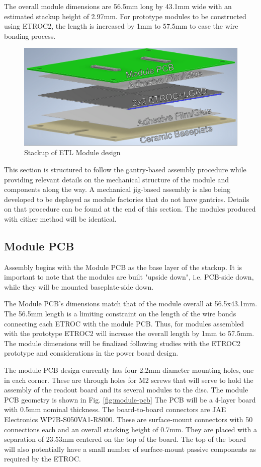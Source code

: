 \documentclass[10pt]{datasheet}
\begin{document}
The overall module dimensions are 56.5mm long by 43.1mm wide with an estimated stackup height of 2.97mm. For prototype modules to be constructed using ETROC2, the length is increased by 1mm to 57.5mm to ease the wire bonding process.


\begin{figure}[h]
	\centering
	\includegraphics[width=\textwidth]{figures/overview.png}
	\caption{Stackup of ETL Module design}
	\label{fig:overview}
\end{figure}

This section is structured to follow the gantry-based assembly procedure while providing relevant details on the mechanical structure of the module and components along the way. A mechanical jig-based assembly is also being developed to be deployed as module factories that do not have gantries. Details on that procedure can be found at the end of this section. The modules produced with either method will be identical.


\subsection{Module PCB}

Assembly begins with the Module PCB as the base layer of the stackup. It is important to note that the modules are built "upside down", i.e. PCB-side down, while they will be mounted baseplate-side down.

The Module PCB's dimensions match that of the module overall at 56.5x43.1mm.  The 56.5mm length is a limiting constraint on the length of the wire bonds connecting each ETROC with the module PCB.  Thus, for modules assembled with the prototype ETROC2 will increase the overall length by 1mm to 57.5mm.  The module dimensions will be finalized following studies with the ETROC2 prototype and considerations in the power board design.

The module PCB design currently has four 2.2mm diameter mounting holes, one in each corner. These are through holes for M2 screws that will serve to hold the assembly of the readout board and its several modules to the disc. The module PCB geometry is shown in Fig. \ref{fig:module-pcb} The PCB will be a 4-layer board with 0.5mm nominal thickness. The board-to-board connectors are JAE Electronics WP7B-S050VA1-R8000. These are surface-mount connectors with 50 connections each and an overall stacking height of 0.7mm. They are placed with a separation of 23.53mm centered on the top of the board. The top of the board will also potentially have a small number of surface-mount passive components as required by the ETROC.
\end{document}

